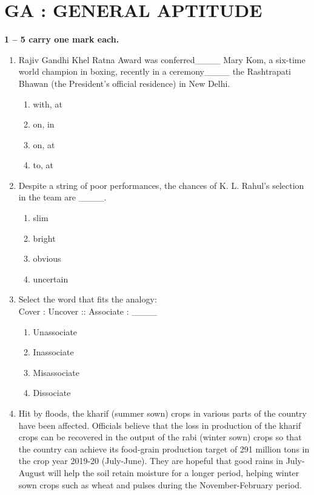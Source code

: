 \documentclass[journal,12pt,onecolumn]{IEEEtran}
\begin{document}
\section*{\centering GA : GENERAL APTITUDE}

\noindent \textbf{1 -- 5 carry one mark each.}

\begin{enumerate}[label=\arabic*.]

\item Rajiv Gandhi Khel Ratna Award was conferred\_\_\_\_ Mary Kom, a six-time world champion in boxing, recently in a ceremony\_\_\_\_ the Rashtrapati Bhawan (the President’s official residence) in New Delhi.
\begin{multicols}{2}
\begin{enumerate}[label=(\Alph*)]
    \item with, at
    \item on, in
    \item on, at
    \item to, at
\end{enumerate}
\end{multicols}

\item Despite a string of poor performances, the chances of K. L. Rahul’s selection in the team are \_\_\_\_.
\begin{multicols}{2}
\begin{enumerate}[label=(\Alph*)]
    \item slim
    \item bright
    \item obvious
    \item uncertain
\end{enumerate}
\end{multicols}

\item Select the word that fits the analogy: \\ 
Cover : Uncover :: Associate : \_\_\_\_
\begin{multicols}{2}
\begin{enumerate}[label=(\Alph*)]
    \item Unassociate
    \item Inassociate
    \item Misassociate
    \item Dissociate
\end{enumerate}
\end{multicols}

\item Hit by floods, the kharif (summer sown) crops in various parts of the country have been affected. Officials believe that the loss in production of the kharif crops can be recovered in the output of the rabi (winter sown) crops so that the country can achieve its food-grain production target of 291 million tons in the crop year 2019-20 (July-June). They are hopeful that good rains in July-August will help the soil retain moisture for a longer period, helping winter sown crops such as wheat and pulses during the November-February period.\\


\end{enumerate}
\end{document}
